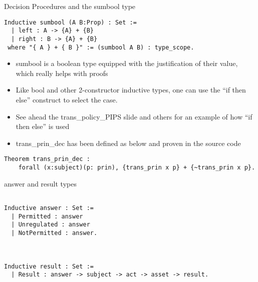\documentclass{beamer}
\begin{document}
\begin{frame}[fragile]{Decision Procedures and the sumbool type}
\lstset{language=Coq}
\begin{lstlisting}
Inductive sumbool (A B:Prop) : Set :=
  | left : A -> {A} + {B}
  | right : B -> {A} + {B}
 where "{ A } + { B }" := (sumbool A B) : type_scope.
\end{lstlisting}
\begin{itemize}
\item sumbool is a boolean type equipped with the justification of their value, which really helps with proofs
\item Like bool and other 2-constructor inductive types, one can use the ``if then else'' construct to select the case. 
\item See ahead the trans\_policy\_PIPS slide and others for an example of how ``if then else'' is used
\item trans\_prin\_dec has been defined as below and proven in the source code
\end{itemize}
\lstset{language=Coq}
\begin{lstlisting}
Theorem trans_prin_dec : 
    forall (x:subject)(p: prin), {trans_prin x p} + {~trans_prin x p}.
\end{lstlisting}
\end{frame}
\begin{frame}[fragile]{answer and result types}
\Large
\lstset{language=Coq}
\begin{lstlisting}

Inductive answer : Set :=
  | Permitted : answer
  | Unregulated : answer
  | NotPermitted : answer.



Inductive result : Set :=
  | Result : answer -> subject -> act -> asset -> result.
\end{lstlisting}
\end{frame}
\end{document}
